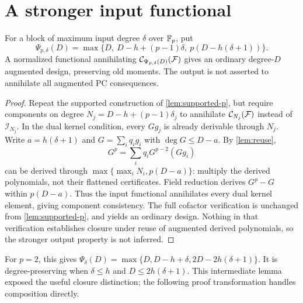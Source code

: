 \section{A stronger input functional}
\begin{lemma}\label{lem:pcbased}
For a block of maximum input degree $\delta$ over $\mathbb F_p$, put
\[
 \Psi_{p,\delta}(D)=\max\{D,\ D-h+(p-1)\delta,
                      \ p(D-h(\delta+1))\}.
\]
A normalized functional annihilating $\mathcal C_{\Psi_{p,\delta}(D)}(\mathcal F)$ gives an ordinary degree-$D$ augmented design, preserving old moments. The output is not asserted to annihilate all augmented PC consequences.
\end{lemma}
\begin{proof}
Repeat the supported construction of \cref{lem:supported-p}, but require components on degree $N_j=D-h+(p-1)\delta_j$ to annihilate $\mathcal C_{N_j}(\mathcal F)$ instead of $\mathcal I_{N_j}$. In the dual kernel condition, every $Gg_j$ is already derivable through $N_j$. Write $a=h(\delta+1)$ and $G=\sum_iq_ig_i$ with $\deg G\le D-a$. By \cref{lem:reuse},
\[
 G^p=\sum_iq_iG^{p-2}(Gg_i)
\]
can be derived through $\max\{\max_iN_i,p(D-a)\}$: multiply the derived polynomials, not their flattened certificates. Field reduction derives $G^p-G$ within $p(D-a)$. Thus the input functional annihilates every dual kernel element, giving component consistency. The full cofactor verification is unchanged from \cref{lem:supported-p}, and yields an ordinary design. Nothing in that verification establishes closure under reuse of augmented derived polynomials, so the stronger output property is not inferred.
\end{proof}

For $p=2$, this gives $\Psi_\delta(D)=\max\{D,D-h+\delta,2D-2h(\delta+1)\}$. It is degree-preserving when $\delta\le h$ and $D\le2h(\delta+1)$. This intermediate lemma exposed the useful closure distinction; the following proof transformation handles composition directly.

